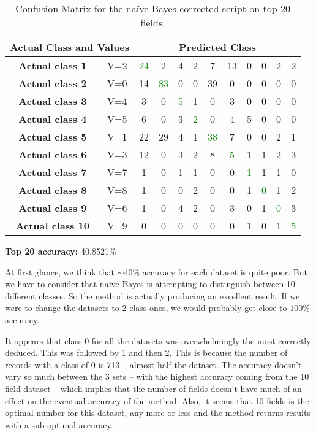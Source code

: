 \documentclass[a4paper,10pt]{article}
\begin{document}
       \begin{table}[ht!] 
        \centering
        \caption{Confusion Matrix for the na\"{i}ve Bayes corrected script on top 20 fields.} 
        \begin{tabular}{|c|c||c|c|c|c|c|c|c|c|c|c|}
          \hline
           \multicolumn{2}{|c||}{\textbf{Actual Class and Values}}&
          \multicolumn{10}{|c|}{\textbf{Predicted Class}} \\ \hline
          \textbf{Actual class 1} & V=2 &\textcolor{green}{24} &2 &4 &2 &7 &13 &0 &0 &2 &2      \\
          \textbf{Actual class 2} & V=0 &14 &\textcolor{green}{83} &0 &0 &39 &0 &0 &0 &0 &0      \\
          \textbf{Actual class 3} & V=4 &3 &0 &\textcolor{green}{5} &1 &0 &3 &0 &0 &0 &0     \\
          \textbf{Actual class 4} & V=5 &6 &0 &3 &\textcolor{green}{2} &0 &4 &5 &0 &0 &0     \\
          \textbf{Actual class 5} & V=1 &22 &29 &4 &1 &\textcolor{green}{38} &7 &0 &0 &2 &1       \\
          \textbf{Actual class 6} & V=3 &12 &0 &3 &2 &8 &\textcolor{green}{5} &1 &1 &2 &3       \\
          \textbf{Actual class 7} & V=7 &1 &0 &1 &1 &0 &0 &\textcolor{green}{1} &1 &1 &0       \\
          \textbf{Actual class 8} & V=8 &1 &0 &0 &2 &0 &0 &1 &\textcolor{green}{0} &1 &2       \\
          \textbf{Actual class 9} & V=6 &1 &0 &4 &2 &0 &3 &0 &1 &\textcolor{green}{0} &3       \\
          \textbf{Actual class 10}& V=9 &0 &0 &0 &0 &0 &0 &1 &0 &1 &\textcolor{green}{5}       \\
          \hline
        \end{tabular}
      \end{table}
      \textbf{Top 20 accuracy:} 40.8521\% \newline 

      At first glance, we think that $\sim$40\% accuracy for each dataset is quite poor. But we have to consider
      that na\"{i}ve Bayes is attempting to distinguish between 10 different classes. So the method is actually
      producing an excellent result. If we were to change the datasets to 2-class ones, we would probably get close
      to 100\% accuracy. 
  
      It appears that class 0 for all the datasets was overwhelmingly the most correctly deduced. This was followed
      by 1 and then 2. This is because the number of records with a class of 0 is 713 -- almost half the dataset.
      The accuracy doesn't vary so much between the 3 sets -- with the highest accuracy coming from the 10 field
      dataset -- which implies that the number of fields doesn't have much of an effect on the eventual accuracy 
      of the method. Also, it seems that 10 fields is the optimal number for this dataset, any more or less and the
      method returns results with a sub-optimal accuracy. 
         
\end{document}
